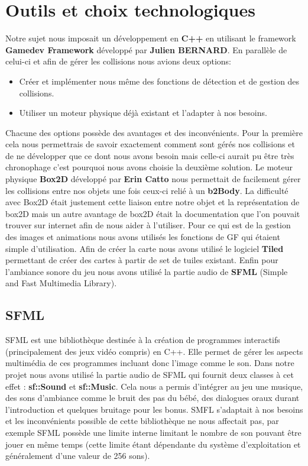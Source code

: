 \documentclass{article}
\begin{document}
\section{Outils et choix technologiques}
Notre sujet nous imposait un développement en \textbf{C++} en utilisant le framework \textbf{Gamedev Framework} développé par \textbf{Julien BERNARD}. En parallèle de celui-ci et afin de gérer les collisions nous avions deux options:
\begin{itemize}
    \item Créer et implémenter nous même des fonctions de détection et de gestion des collisions.
    \item Utiliser un moteur physique déjà existant et l'adapter à nos besoins.
\end{itemize}\bigbreak
Chacune des options possède des avantages et des inconvénients. Pour la première cela nous permettrais de savoir exactement comment sont gérés nos collisions et de ne développer que ce dont nous avons besoin mais celle-ci aurait pu être très chronophage c'est pourquoi nous avons choisie la deuxième solution. Le moteur physique \textbf{Box2D} développé par \textbf{Erin Catto} nous permettait de facilement gérer les collisions entre nos objets une fois ceux-ci relié à un \textbf{b2Body}. La difficulté avec Box2D était justement cette liaison entre notre objet et la représentation de box2D mais un autre avantage de box2D était la documentation que l'on pouvait trouver sur internet afin de nous aider à l'utiliser.\bigbreak
Pour ce qui est de la gestion des images et animations nous avons utilisés les fonctions de GF qui étaient simple d'utilisation. Afin de créer la carte nous avons utilisé le logiciel \textbf{Tiled} permettant de créer des cartes à partir de set de tuiles existant. Enfin pour l'ambiance sonore du jeu nous avons utilisé la partie audio de \textbf{SFML} (Simple and Fast Multimedia Library).

\subsection{SFML}
SFML est une bibliothèque destinée à la création de programmes interactifs (principalement des jeux vidéo compris) en C++. Elle permet de gérer les aspects multimédia de ces programmes incluant donc l'image comme le son. Dans notre projet nous avons utilisé la partie audio de SFML qui fournit deux classes à cet effet : \textbf{sf::Sound} et \textbf{sf::Music}. Cela nous a permis d'intégrer au jeu une musique, des sons d'ambiance comme le bruit des pas du bébé, des dialogues oraux durant l'introduction et quelques bruitage pour les bonus. SMFL s'adaptait à nos besoins et les inconvénients possible de cette bibliothèque ne nous affectait pas, par exemple SFML possède une limite interne limitant le nombre de son pouvant être jouer en même temps (cette limite étant dépendante du système d'exploitation et généralement d'une valeur de 256 sons).
\end{document}
